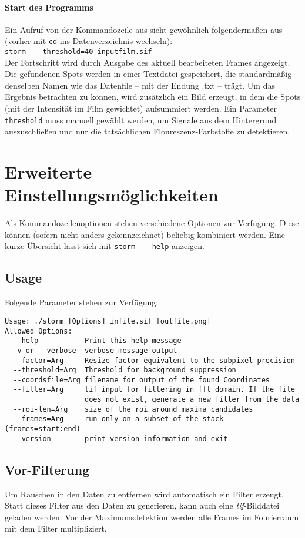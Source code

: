 \documentclass[DIV15,a4paper]{scrartcl}
\begin{document}
\paragraph{Start des Programms} 
Ein Aufruf von der Kommandozeile aus sieht gewöhnlich folgendermaßen aus
(vorher mit \texttt{cd} ins Datenverzeichnis wechseln):\\
\texttt{storm -\,-threshold=40 inputfilm.sif}\\
Der Fortschritt wird durch Ausgabe des aktuell bearbeiteten Frames angezeigt.
Die gefundenen Spots werden in einer Textdatei gespeichert, die standardmäßig
denselben Namen wie das Datenfile -- mit der Endung .txt -- trägt. %
Um das Ergebnis betrachten zu können, wird zusätzlich ein Bild erzeugt, 
in dem die Spots (mit der Intensität im Film gewichtet) aufsummiert werden. 
Ein Parameter \texttt{threshold} muss manuell gewählt werden, um Signale 
aus dem Hintergrund auszuschließen und nur die tatsächlichen Floureszenz-Farbstoffe 
zu detektieren.

\section{Erweiterte Einstellungsmöglichkeiten}
Als Kommandozeilenoptionen stehen verschiedene Optionen zur Verfügung.
Diese können (sofern nicht anders gekennzeichnet) beliebig kombiniert werden.
Eine kurze Übersicht lässt sich mit \texttt{storm -\,-help} anzeigen.

\subsection{Usage}
Folgende Parameter stehen zur Verfügung:
\begin{verbatim}
Usage: ./storm [Options] infile.sif [outfile.png]
Allowed Options: 
  --help           Print this help message
  -v or --verbose  verbose message output
  --factor=Arg     Resize factor equivalent to the subpixel-precision
  --threshold=Arg  Threshold for background suppression
  --coordsfile=Arg filename for output of the found Coordinates
  --filter=Arg     tif input for filtering in fft domain. If the file
                   does not exist, generate a new filter from the data
  --roi-len=Arg    size of the roi around maxima candidates
  --frames=Arg     run only on a subset of the stack (frames=start:end)
  --version        print version information and exit
\end{verbatim}

\subsection{Vor-Filterung}
Um Rauschen in den Daten zu entfernen wird automatisch ein Filter erzeugt.
Statt dieses Filter aus den Daten zu generieren, kann auch eine \emph{tif}-Bilddatei 
geladen werden. Vor der Maximumsdetektion werden alle Frames im Fourierraum 
mit dem Filter multipliziert. 
\end{document}
